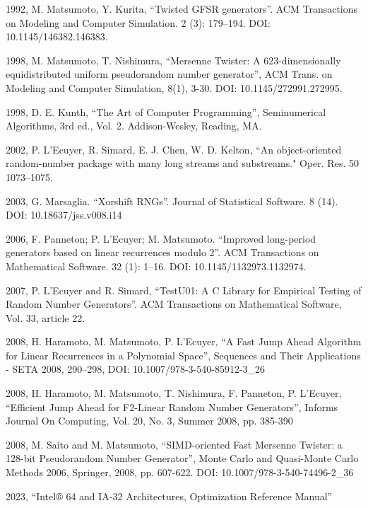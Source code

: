 \documentclass[preprint,1p,times]{elsarticle}
\begin{document}
\begin{thebibliography}{9}

 1992, M. Matsumoto, Y. Kurita, ``Twisted GFSR generators''. ACM Transactions on Modeling and Computer Simulation. 2 (3): 179--194. DOI: 10.1145/146382.146383.

 1998, M. Matsumoto, T. Nishimura, ``Mersenne Twister: A 623-dimensionally equidistributed uniform pseudorandom number generator'', ACM Trans. on Modeling and Computer Simulation, 8(1), 3-30. DOI: 10.1145/272991.272995.

 1998, D. E. Kunth, ``The Art of Computer Programming'', Seminumerical Algorithms, 3rd ed., Vol. 2. Addison-Wesley, Reading, MA.

 2002, P. L’Ecuyer, R. Simard, E. J. Chen, W. D. Kelton, ``An object-oriented random-number package with many long streams and substreams." Oper. Res. 50 1073--1075.

 2003, G. Marsaglia. ``Xorshift RNGs''. Journal of Statistical Software. 8 (14). DOI: 10.18637/jss.v008.i14

 2006, F. Panneton; P. L'Ecuyer; M. Matsumoto. ``Improved long-period generators based on linear recurrences modulo 2''. ACM Transactions on Mathematical Software. 32 (1): 1--16. DOI: 10.1145/1132973.1132974.

 2007, P. L'Ecuyer and R. Simard, ``TestU01: A C Library for Empirical Testing of Random Number Generators''. ACM Transactions on Mathematical Software, Vol. 33, article 22.

 2008, H. Haramoto, M. Matsumoto, P. L’Ecuyer, ``A Fast Jump Ahead Algorithm for Linear Recurrences in a Polynomial Space'', Sequences and Their Applications - SETA 2008, 290--298, DOI: 10.1007/978-3-540-85912-3\_26

 2008, H. Haramoto, M. Matsumoto, T. Nishimura, F. Panneton, P. L’Ecuyer, ``Efficient Jump Ahead for F2-Linear Random Number Generators'', Informs Journal On Computing, Vol. 20, No. 3, Summer 2008, pp. 385-390

 2008, M. Saito and M. Matsumoto, ``SIMD-oriented Fast Mersenne Twister: a 128-bit Pseudorandom Number Generator'', Monte Carlo and Quasi-Monte Carlo Methods 2006, Springer, 2008, pp. 607-622. DOI: 10.1007/978-3-540-74496-2\_36

 2023, ``Intel® 64 and IA-32 Architectures, Optimization Reference Manual''

\end{thebibliography}
\end{document}
